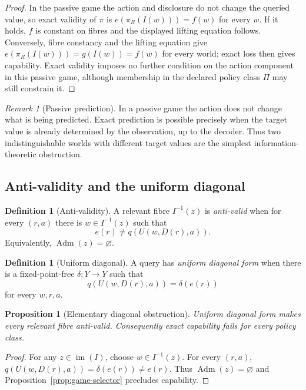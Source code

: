 \documentclass[11pt]{article}
\theoremstyle{plain}
\newtheorem{proposition}[theorem]{Proposition}
\theoremstyle{definition}
\newtheorem{definition}[theorem]{Definition}
\theoremstyle{remark}
\newtheorem{remark}[theorem]{Remark}
\newcommand{\im}{\operatorname{im}}
\newcommand{\Adm}{\operatorname{Adm}}
\begin{document}
\begin{proof}
In the passive game the action and disclosure do not change the queried value,
so exact validity of $\pi$ is
$e(\pi_R(I(w)))=f(w)$ for every $w$. If it holds, $f$ is constant on fibres and
the displayed lifting equation follows. Conversely, fibre constancy and the
lifting equation give $e(\pi_R(I(w)))=g(I(w))=f(w)$ for every world; exact loss
then gives capability. Exact validity imposes no further condition on the action
component in this passive game, although membership in the declared policy class
$\Pi$ may still constrain it.
\end{proof}

\begin{remark}[Passive prediction]
In a passive game the action does not change what is being predicted. Exact
prediction is possible precisely when the target value is already determined by
the observation, up to the decoder. Thus two indistinguishable worlds with
different target values are the simplest information-theoretic obstruction.
\end{remark}

\subsection{Anti-validity and the uniform diagonal}

\begin{definition}[Anti-validity]\label{def:antivalid}
A relevant fibre $I^{-1}(z)$ is \emph{anti-valid} when for every $(r,a)$ there
is $w\in I^{-1}(z)$ such that
\[
e(r)\ne q(U(w,D(r),a)).
\]
Equivalently, $\Adm(z)=\varnothing$.
\end{definition}

\begin{definition}[Uniform diagonal]\label{def:diag}
A query has \emph{uniform diagonal form} when there is a fixed-point-free
$\delta:Y\to Y$ such that
\[
q(U(w,D(r),a))=\delta(e(r))
\]
for every $w,r,a$.
\end{definition}

\begin{proposition}[Elementary diagonal obstruction]\label{prop:diagonal}
Uniform diagonal form makes every relevant fibre anti-valid. Consequently exact
capability fails for every policy class.
\end{proposition}

\begin{proof}
For any $z\in\im(I)$, choose $w\in I^{-1}(z)$. For every $(r,a)$,
$q(U(w,D(r),a))=\delta(e(r))\ne e(r)$. Thus $\Adm(z)=\varnothing$ and
Proposition~\ref{prop:game-selector} precludes capability.
\end{proof}
\end{document}
